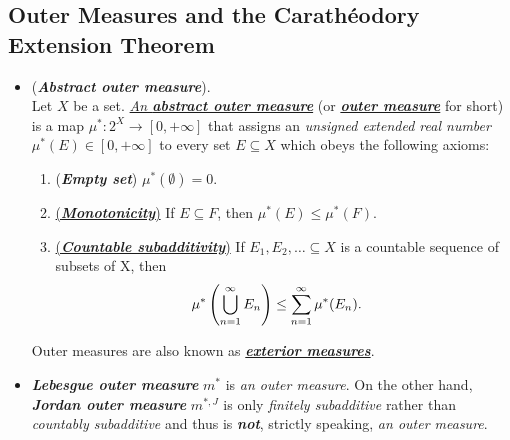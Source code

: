 \documentclass[11pt]{article}
\begin{document}
\subsection{Outer Measures and the Carath{\'e}odory Extension Theorem}
\begin{itemize}

\item \begin{definition} (\emph{\textbf{Abstract outer measure}}). \citep{tao2011introduction} \\
Let $X$ be a set. \underline{\emph{An \textbf{abstract outer measure}}} (or \underline{\emph{\textbf{outer measure}}} for short) is a map $\mu^{*}: 2^X \rightarrow [0, +\infty]$ that assigns an \emph{unsigned extended real number} $\mu^{*}(E) \in [0, +\infty]$ to every set $E \subseteq X$ which obeys the following axioms:
\begin{enumerate}
\item (\textbf{\emph{Empty set}}) $\mu^{*}(\emptyset) = 0$.
\item \underline{(\textbf{\emph{Monotonicity}})} If $E \subseteq F$,  then $\mu^{*}(E) \le  \mu^{*}(F)$.
\item  \underline{(\textbf{\emph{Countable subadditivity}})} If $E_1, E_2, \ldots \subseteq X$ is a countable sequence of subsets of X, then 
\begin{align*}
\mu^{*}\left(\bigcup_{n=1}^{\infty} E_n\right) &\le \sum_{n=1}^{\infty}\mu^{*}(E_n).
\end{align*}
\end{enumerate}
Outer measures are also known as \underline{\emph{\textbf{exterior measures}}}.
\end{definition}

\item \begin{remark}
\emph{\textbf{Lebesgue outer measure}} $m^{*}$ is \emph{an outer measure}. On the other hand, \emph{\textbf{Jordan outer measure}} $m^{*, J}$ is only \emph{finitely subadditive} rather than \emph{countably subadditive} and thus is \emph{\textbf{not}}, strictly speaking, \emph{an outer measure}.
\end{remark}


\end{itemize}
\end{document}
